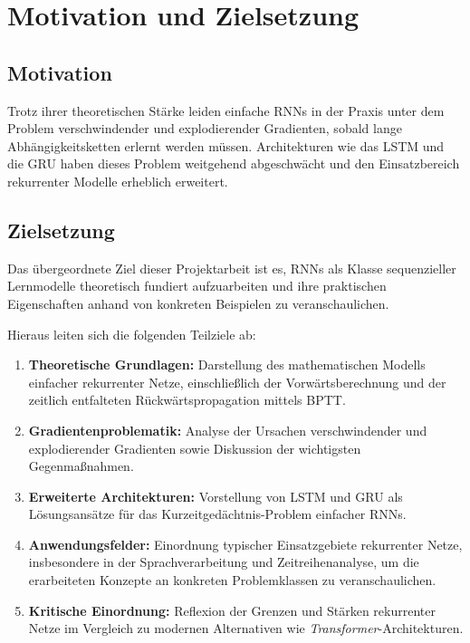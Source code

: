 \chapter{Motivation und Zielsetzung}

\section{Motivation}


Trotz ihrer theoretischen Stärke leiden einfache \acp{RNN} in der Praxis unter dem Problem verschwindender und
explodierender Gradienten, sobald lange Abhängigkeitsketten erlernt werden müssen. Architekturen wie das
\ac{LSTM} und die \ac{GRU} haben dieses Problem weitgehend abgeschwächt und den Einsatzbereich rekurrenter
Modelle erheblich erweitert.


\section{Zielsetzung}

Das übergeordnete Ziel dieser Projektarbeit ist es, \acp{RNN} als Klasse sequenzieller Lernmodelle theoretisch
fundiert aufzuarbeiten und ihre praktischen Eigenschaften anhand von konkreten Beispielen zu veranschaulichen.

Hieraus leiten sich die folgenden Teilziele ab:

\begin{enumerate}
    \item \textbf{Theoretische Grundlagen:} Darstellung des mathematischen Modells einfacher rekurrenter Netze,
    einschließlich der Vorwärtsberechnung und der zeitlich entfalteten Rückwärtspropagation
    mittels \ac{BPTT}.

    \item \textbf{Gradientenproblematik:} Analyse der Ursachen verschwindender und explodierender Gradienten
    sowie Diskussion der wichtigsten Gegenmaßnahmen.

    \item \textbf{Erweiterte Architekturen:} Vorstellung von \ac{LSTM} und \ac{GRU} als Lösungsansätze
    für das Kurzeitgedächtnis-Problem einfacher \acp{RNN}.

    \item \textbf{Anwendungsfelder:} Einordnung typischer Einsatzgebiete rekurrenter Netze, insbesondere in
    der Sprachverarbeitung und Zeitreihenanalyse, um die erarbeiteten Konzepte an konkreten Problemklassen
    zu veranschaulichen.

    \item \textbf{Kritische Einordnung:} Reflexion der Grenzen und Stärken rekurrenter Netze im Vergleich
    zu modernen Alternativen wie \textit{Transformer}-Architekturen.
\end{enumerate}


